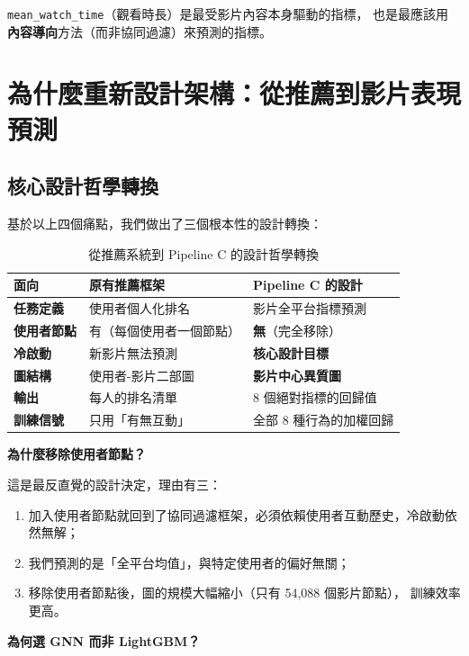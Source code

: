 \documentclass[12pt, a4paper]{article}
\begin{document}
\texttt{mean\_watch\_time}（觀看時長）是最受影片內容本身驅動的指標，
也是最應該用\textbf{內容導向}方法（而非協同過濾）來預測的指標。

\section{為什麼重新設計架構：從推薦到影片表現預測}
\label{sec:motivation}

\subsection{核心設計哲學轉換}

基於以上四個痛點，我們做出了三個根本性的設計轉換：

\begin{table}[H]
\centering
\caption{從推薦系統到 Pipeline C 的設計哲學轉換}
\begin{tabular}{lll}
\toprule
\textbf{面向} & \textbf{原有推薦框架} & \textbf{Pipeline C 的設計} \\
\midrule
\textbf{任務定義} & 使用者個人化排名 & 影片全平台指標預測 \\
\textbf{使用者節點} & 有（每個使用者一個節點） & \textbf{無}（完全移除） \\
\textbf{冷啟動} & 新影片無法預測 & \textbf{核心設計目標} \\
\textbf{圖結構} & 使用者-影片二部圖 & \textbf{影片中心異質圖} \\
\textbf{輸出} & 每人的排名清單 & 8 個絕對指標的回歸值 \\
\textbf{訓練信號} & 只用「有無互動」 & 全部 8 種行為的加權回歸 \\
\bottomrule
\end{tabular}
\end{table}

\textbf{為什麼移除使用者節點？}

這是最反直覺的設計決定，理由有三：
\begin{enumerate}[leftmargin=*]
\item 加入使用者節點就回到了協同過濾框架，必須依賴使用者互動歷史，冷啟動依然無解；
\item 我們預測的是「全平台均值」，與特定使用者的偏好無關；
\item 移除使用者節點後，圖的規模大幅縮小（只有 54,088 個影片節點），
  訓練效率更高。
\end{enumerate}

\textbf{為何選 GNN 而非 LightGBM？}
\end{document}
